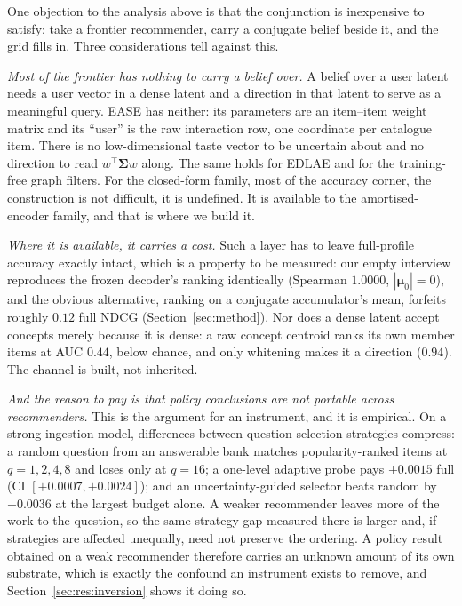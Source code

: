 \documentclass[manuscript,screen]{acmart}
\newcommand{\bmu}{\boldsymbol{\mu}}
\newcommand{\bSigma}{\boldsymbol{\Sigma}}
\begin{document}
One objection to the analysis above is that the conjunction is inexpensive to satisfy: take a frontier recommender, carry a conjugate belief beside it, and the grid fills in. Three considerations tell against this.

\emph{Most of the frontier has nothing to carry a belief over.} A belief over a user latent needs a user vector in a dense latent and a direction in that latent to serve as a meaningful query. EASE has neither: its parameters are an item--item weight matrix and its ``user'' is the raw interaction row, one coordinate per catalogue item. There is no low-dimensional taste vector to be uncertain about and no direction to read $w^\top\bSigma w$ along. The same holds for EDLAE and for the training-free graph filters. For the closed-form family, most of the accuracy corner, the construction is not difficult, it is undefined. It is available to the amortised-encoder family, and that is where we build it.

\emph{Where it is available, it carries a cost.} Such a layer has to leave full-profile accuracy exactly intact, which is a property to be measured: our empty interview reproduces the frozen decoder's ranking identically (Spearman $1.0000$, $|\bmu_0|=0$), and the obvious alternative, ranking on a conjugate accumulator's mean, forfeits roughly $0.12$ full NDCG (Section~\ref{sec:method}). Nor does a dense latent accept concepts merely because it is dense: a raw concept centroid ranks its own member items at AUC $0.44$, below chance, and only whitening makes it a direction ($0.94$). The channel is built, not inherited.

\emph{And the reason to pay is that policy conclusions are not portable across recommenders.} This is the argument for an instrument, and it is empirical. On a strong ingestion model, differences between question-selection strategies compress: a random question from an answerable bank matches popularity-ranked items at $q{=}1,2,4,8$ and loses only at $q{=}16$; a one-level adaptive probe pays $+0.0015$ full (CI $[+0.0007,+0.0024]$); and an uncertainty-guided selector beats random by $+0.0036$ at the largest budget alone. A weaker recommender leaves more of the work to the question, so the same strategy gap measured there is larger and, if strategies are affected unequally, need not preserve the ordering. A policy result obtained on a weak recommender therefore carries an unknown amount of its own substrate, which is exactly the confound an instrument exists to remove, and Section~\ref{sec:res:inversion} shows it doing so.
\end{document}
